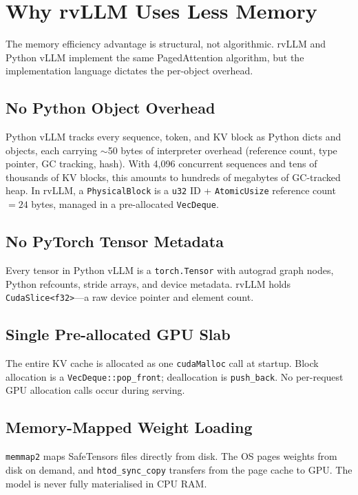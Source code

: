 \section{Why rvLLM Uses Less Memory}
\label{sec:memory}

The memory efficiency advantage is structural, not algorithmic. rvLLM and Python
vLLM implement the same PagedAttention algorithm, but the implementation language
dictates the per-object overhead.

\subsection{No Python Object Overhead}

Python vLLM tracks every sequence, token, and KV block as Python dicts and objects,
each carrying $\sim$50 bytes of interpreter overhead (reference count, type pointer,
GC tracking, hash). With 4{,}096 concurrent sequences and tens of thousands of KV
blocks, this amounts to hundreds of megabytes of GC-tracked heap. In rvLLM, a
\texttt{PhysicalBlock} is a \texttt{u32} ID + \texttt{AtomicUsize} reference count
$= 24$ bytes, managed in a pre-allocated \texttt{VecDeque}.

\subsection{No PyTorch Tensor Metadata}

Every tensor in Python vLLM is a \texttt{torch.Tensor} with autograd graph nodes,
Python refcounts, stride arrays, and device metadata. rvLLM holds
\texttt{CudaSlice<f32>}---a raw device pointer and element count.

\subsection{Single Pre-allocated GPU Slab}

The entire KV cache is allocated as one \texttt{cudaMalloc} call at startup. Block
allocation is a \texttt{VecDeque::pop\_front}; deallocation is \texttt{push\_back}.
No per-request GPU allocation calls occur during serving.

\subsection{Memory-Mapped Weight Loading}

\texttt{memmap2} maps SafeTensors files directly from disk. The OS pages weights
from disk on demand, and \texttt{htod\_sync\_copy} transfers from the page cache
to GPU. The model is never fully materialised in CPU RAM.

